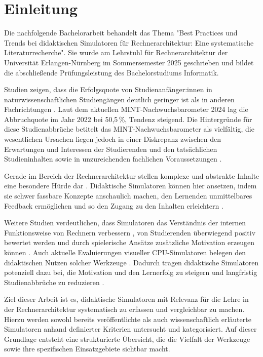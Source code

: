 \chapter{Einleitung}

Die nachfolgende Bachelorarbeit behandelt das Thema "Best Practices und Trends bei didaktischen Simulatoren für Rechnerarchitektur: Eine systematische Literaturrecherche". Sie wurde am Lehrstuhl für Rechnerarchitektur der Universität Erlangen-Nürnberg im Sommersemester 2025 geschrieben und bildet die abschließende Prüfungsleistung des Bachelorstudiums Informatik.

Studien zeigen, dass die Erfolgsquote von Studienanfänger:innen in naturwissenschaftlichen Studiengängen deutlich geringer ist als in anderen Fachrichtungen \parencite[S.~370]{burdinski_lehrvideos_2024}. Laut dem aktuellen MINT-Nachwuchsbarometer 2024 lag die Abbruchquote im Jahr 2022 bei 50,5\,\%, Tendenz steigend. Die Hintergründe für diese Studienabbrüche betitelt das MINT-Nachwuchsbarometer als vielfältig, die wesentlichen Ursachen liegen jedoch in einer Diskrepanz zwischen den Erwartungen und Interessen der Studierenden und den tatsächlichen Studieninhalten sowie in unzureichenden fachlichen Voraussetzungen \parencite[S.~21]{joachim_herz_stiftung_mint_2024}.

Gerade im Bereich der Rechnerarchitektur stellen komplexe und abstrakte Inhalte eine besondere Hürde dar \parencite[S.~1]{grober_championship_2022}. Didaktische Simulatoren können hier ansetzen, indem sie schwer fassbare Konzepte anschaulich machen, den Lernenden unmittelbares Feedback ermöglichen und so den Zugang zu den Inhalten erleichtern \parencite[S.~11]{zeichner_using_2020}. 

Weitere Studien verdeutlichen, dass Simulatoren das Verständnis der internen Funktionsweise von Rechnern verbessern \parencite[S.~215]{prasad_using_2015}, von Studierenden überwiegend positiv bewertet werden \parencite[S.~8]{besim_understanding_2012} und durch spielerische Ansätze zusätzliche Motivation erzeugen können \parencite[S.~453]{schlag_gamifizierung_2021}. Auch aktuelle Evaluierungen visueller CPU-Simulatoren belegen den didaktischen Nutzen solcher Werkzeuge \parencites[S.~11]{maxnuck_soares_use_2016}[S.~75]{cortinovis_further_2024}. Dadurch tragen didaktische Simulatoren potenziell dazu bei, die Motivation und den Lernerfolg zu steigern und langfristig Studienabbrüche zu reduzieren \parencite[S.~272]{kornelsen_expedition_2005}.

Ziel dieser Arbeit ist es, didaktische Simulatoren mit Relevanz für die Lehre in der Rechnerarchitektur systematisch zu erfassen und vergleichbar zu machen. Hierzu werden sowohl bereits veröffentlichte als auch wissenschaftlich erläuterte Simulatoren anhand definierter Kriterien untersucht und kategorisiert. Auf dieser Grundlage entsteht eine strukturierte Übersicht, die die Vielfalt der Werkzeuge sowie ihre spezifischen Einsatzgebiete sichtbar macht.

